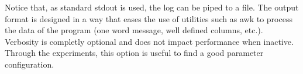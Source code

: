   Notice that, as standard stdout is used, the log can be piped to a file. The
  output format is designed in a way that eases the use of utilities such as
  awk to process the data of the program (one word message, well defined
  columns, etc.).\\

  Verbosity is completly optional and does not impact performance when inactive. Through the experiments, this option is useful to find a good parameter configuration.

